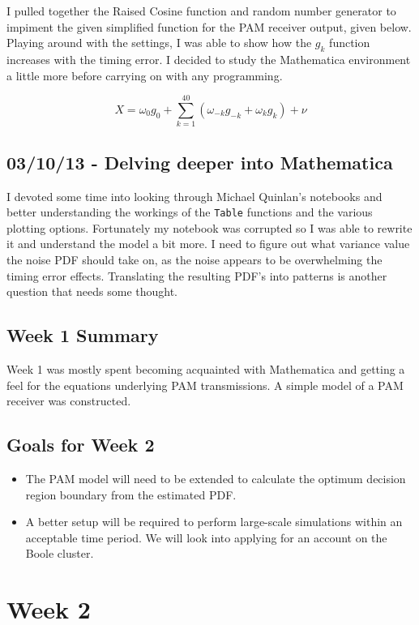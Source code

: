 I pulled together the Raised Cosine function and random number generator
to impiment the given simplified function for the PAM receiver output,
given below. Playing around with the settings, I was able to show how
the $g_k$ function increases with the timing error. I decided to study
the Mathematica environment a little more before carrying on with any
programming.

\[
X = \omega_0 g_0 + \sum_{k=1}^{40} ( \omega_{-k} g_{-k} + \omega_k g_k ) + \nu
\]

\subsection{03/10/13 - Delving deeper into Mathematica}

I devoted some time into looking through Michael Quinlan's notebooks and
better understanding the workings of the \texttt{Table} functions and
the various plotting options. Fortunately my notebook was corrupted so I
was able to rewrite it and understand the model a bit more. I need to
figure out what variance value the noise PDF should take on, as the
noise appears to be overwhelming the timing error effects. Translating
the resulting PDF's into patterns is another question that needs some
thought.

\subsection{Week 1 Summary}

Week 1 was mostly spent becoming acquainted with Mathematica and getting
a feel for the equations underlying PAM transmissions. A simple model of
a PAM receiver was constructed.

\subsection{Goals for Week 2}

\begin{itemize}
\itemsep1pt\parskip0pt
\item
  The PAM model will need to be extended to calculate the optimum
  decision region boundary from the estimated PDF.
\item
  A better setup will be required to perform large-scale simulations
  within an acceptable time period. We will look into applying for an
  account on the Boole cluster.
\end{itemize}

\section{Week 2}

